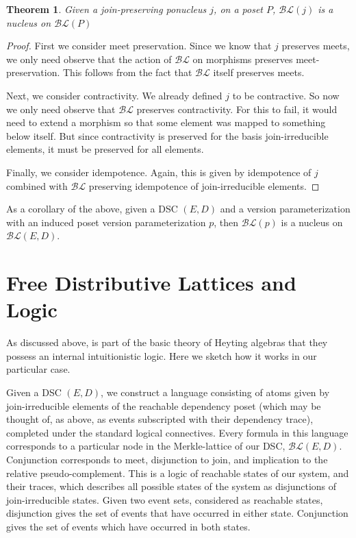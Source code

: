 \documentclass[hoptionsi,review,format=acmsmall]{acmart}
\newtheorem{theorem}{Theorem}[section]
\theoremstyle{definition}
\newcommand{\BLc}{\mathcal{BL}}
\begin{document}
\begin{theorem}
Given a join-preserving ponucleus \(j\), on a poset \(P\),  \(\BLc(j)\) is a nucleus on \(\BLc(P)\)
\end{theorem}
\begin{proof}
First we consider meet preservation. Since we know that \(j\) preserves meets, we only need observe that the action of \(\BLc\) on morphisms preserves meet-preservation. This follows from the fact that \(\BLc\) itself preserves meets.


Next, we consider contractivity. We already defined \(j\) to be contractive. So now we only need observe that \(\BLc\) preserves contractivity. For this to fail, it would need to extend a morphism so that some element was mapped to something below itself. But since contractivity is preserved for the basis join-irreducible elements, it must be preserved for all elements.

Finally, we consider idempotence. Again, this is given by idempotence of \(j\) combined with \(\BLc\) preserving idempotence of join-irreducible elements.
\end{proof}

As a corollary of the above, given a DSC \((E,D)\) and a version parameterization with an induced poset version parameterization \(p\), then \(\BLc(p)\) is a nucleus on \(\BLc(E,D)\).


\section{Free Distributive Lattices and Logic}
As discussed above, is part of the basic theory of Heyting algebras that they possess an internal intuitionistic logic. Here we sketch how it works in our particular case.

Given a DSC \((E,D)\), we construct a language consisting of atoms given by join-irreducible elements of the reachable dependency poset (which may be thought of, as above, as events subscripted with their dependency trace), completed under the standard logical connectives. Every formula in this language corresponds to a particular node in the Merkle-lattice of our DSC, \(\BLc(E,D)\).  Conjunction corresponds to meet, disjunction to join, and implication to the relative pseudo-complement. This is a logic of reachable states of our system, and their traces, which describes all possible states of the system as disjunctions of join-irreducible states. Given two event sets, considered as reachable states, disjunction gives the set of events that have occurred in either state. Conjunction gives the set of events which have occurred in both states.
\end{document}
